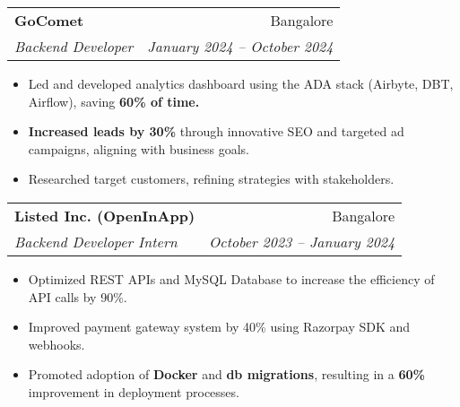 \documentclass[letterpaper,11pt]{article}
\makeatletter
\newcommand{\resumeItem}[1]{
  \item\small{
    {#1 \vspace{-2pt}}
  }
}
\newcommand{\resumeSubheading}[4]{
  \vspace{-2pt}\item
    \begin{tabular*}{0.97\textwidth}[t]{l@{\extracolsep{\fill}}r}
      \textbf{#1} & #2 \\
      \textit{\small#3} & \textit{\small #4} \\
    \end{tabular*}\vspace{-7pt}
}
\newcommand{\resumeItemListStart}{\begin{itemize}}
\newcommand{\resumeItemListEnd}{\end{itemize}\vspace{-5pt}}
\makeatother
\begin{document}

    \resumeSubheading
    {GoComet}{Bangalore}
    {Backend Developer}{January 2024 -- October 2024}
        \resumeItemListStart
            \resumeItem{Led and developed analytics dashboard using the ADA stack (Airbyte, DBT, Airflow), saving \textbf{60\% of time.}}
            \resumeItem{\textbf{Increased leads by 30\%} through innovative SEO and targeted ad campaigns, aligning with business goals.}
            \resumeItem{Researched target customers, refining strategies with stakeholders.}
        \resumeItemListEnd

    \resumeSubheading
    {Listed Inc. (OpenInApp)}{Bangalore}
    {Backend Developer Intern}{October 2023 -- January 2024}
        \resumeItemListStart
            \resumeItem{Optimized REST APIs and MySQL Database to increase the efficiency of API calls by 90\%.}
            \resumeItem{Improved payment gateway system by 40\% using Razorpay SDK and webhooks.}
            \resumeItem{Promoted adoption of \textbf{Docker} and \textbf{db migrations}, resulting in a \textbf{60\%} improvement in deployment processes.}
        \resumeItemListEnd

        
    
       
\end{document}
